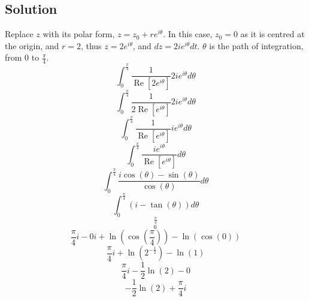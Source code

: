 \documentclass[12pt]{article}
\renewcommand{\Re}{\operatorname{Re}}
\begin{document}
\subsection{Solution}
Replace $z$ with its polar form, $z=z_0+re^{i\theta}$.  In this case, $z_0=0$ as it is centred at the origin, and $r=2$, thus $z=2e^{i\theta}$, and $dz=2ie^{i\theta}dt$.  $\theta$ is the path of integration, from $0$ to $\frac{\pi}{4}$.
\begin{equation}
    \int_0^{\frac{\pi}{4}}{\frac{1}{\Re[2e^{i\theta}]}2ie^{i\theta}}d\theta
\end{equation}\begin{equation}
    \int_0^{\frac{\pi}{4}}{\frac{1}{2\Re[e^{i\theta}]}2ie^{i\theta}}d\theta
\end{equation}
\begin{equation}
    \int_0^{\frac{\pi}{4}}{\frac{1}{\Re[e^{i\theta}]}ie^{i\theta}}d\theta
\end{equation}
\begin{equation}
	\int_0^{\frac{\pi}{4}}{\frac{ie^{i\theta}}{\Re[e^{i\theta}]}}d\theta
\end{equation}
\begin{equation}
    \int_0^{\frac{\pi}{4}}{\frac{i\cos(\theta)-\sin(\theta)}{\cos(\theta)}}d\theta
\end{equation}
\begin{equation}
    \int_0^{\frac{\pi}{4}}(i-\tan(\theta))d\theta
\end{equation}
\begin{equation}
	[i\theta + \ln(\cos(\theta))]_0^{\frac{\pi}{4}}
\end{equation}
\begin{equation}
	\frac{\pi}{4}i-0i+\ln(\cos(\frac{\pi}{4}))-\ln(\cos(0))
\end{equation}
\begin{equation}
	\frac{\pi}{4}i+\ln(2^{-\frac{1}{2}})-\ln(1)
\end{equation}
\begin{equation}
	\frac{\pi}{4}i-\frac{1}{2}\ln(2)-0
\end{equation}
\begin{equation}
	-\frac{1}{2}\ln(2)+\frac{\pi}{4}i
\end{equation}
\end{document}
